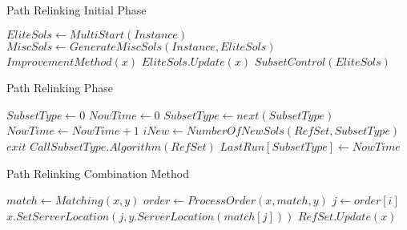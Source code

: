 \begin{algorithm}
  \hline \vspace{3pt}
  \caption{Path Relinking Initial Phase}\label{pr_init}
  \vspace{3pt} \hline
  \begin{algorithmic}[0]
    \State $EliteSols \gets MultiStart(Instance)$
    \Repeat
    \State $MiscSols \gets GenerateMiscSols(Instance,EliteSols)$
    \State $ImprovementMethod(x)$
    \State $EliteSols.Update(x)$
    \EndFor
    \State $SubsetControl(EliteSols)$
    \EndProcedure
    \hline
  \end{algorithmic}
\end{algorithm}

\newpage
\begin{algorithm}
  \hline \vspace{3pt}
  \caption{Path Relinking Phase}\label{pr_pahse}
  \vspace{3pt} \hline
  \begin{algorithmic}[0]
    \State $SubsetType \gets 0$
    \State $NowTime \gets 0$
    \State $SubsetType \gets next(SubsetType)$
    \State $NowTime \gets NowTime + 1$
    \State $iNew \gets NumberOfNewSols(RefSet,SubsetType)$
    \State $exit$
    \EndIf
    \State $Call SubsetType.Algorithm(RefSet)$
    \State $LastRun[SubsetType] \gets NowTime$
    \EndWhile
    \EndProcedure
    \hline
  \end{algorithmic}
\end{algorithm}

\newpage
\begin{algorithm}
  \hline \vspace{3pt}
  \caption{Path Relinking Combination Method}\label{pr_combination}
  \vspace{3pt} \hline
  \begin{algorithmic}[0]
    \State $match \gets Matching(x,y)$
    \State $order \gets ProcessOrder(x,match,y)$
    \State $j \gets order[i]$
    \State $x.SetServerLocation(j,y.ServerLocation(match[j]))$
    \State $RefSet.Update(x)$
    \EndIf \EndFor \EndFor
    \EndProcedure
    \hline
  \end{algorithmic}
\end{algorithm}
